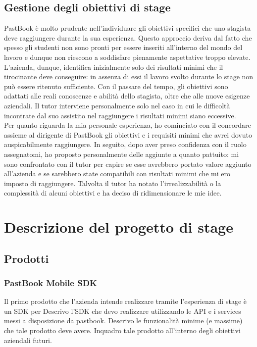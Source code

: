 		\subsection{Gestione degli obiettivi di stage}
			PastBook è molto prudente nell'individuare gli obiettivi specifici che uno stagista deve raggiungere durante la sua
			esperienza. Questo approccio deriva dal fatto che spesso gli studenti non sono pronti per essere inseriti all'interno del
			mondo del lavoro e dunque non riescono a soddisfare pienamente aspettative troppo elevate.\\
			L'azienda, dunque, identifica inizialmente solo dei risultati minimi che il tirocinante deve conseguire: in assenza di essi
			il lavoro svolto durante lo stage non può essere ritenuto sufficiente. Con il passare del tempo, gli obiettivi sono adattati
			alle reali conoscenze e abilità dello stagista, oltre che alle nuove esigenze aziendali. Il tutor interviene personalmente
			solo nel caso in cui le difficoltà incontrate dal suo assistito nel raggiungere i risultati minimi siano eccessive.\\
			Per quanto riguarda la mia personale esperienza, ho cominciato con il concordare assieme al dirigente di PastBook gli
			obiettivi e i requisiti minimi che avrei dovuto auspicabilmente raggiungere. In seguito, dopo aver preso confidenza con il
			ruolo assegnatomi, ho proposto personalmente delle aggiunte a quanto pattuito: mi sono confrontato con il tutor per capire
			se esse avrebbero portato valore aggiunto all'azienda e se sarebbero state compatibili con risultati minimi che mi ero
			imposto di raggiungere. Talvolta il tutor ha notato l'irrealizzabilità o la complessità di alcuni obiettivi e ha deciso di
			ridimensionare le mie idee.
	\section{Descrizione del progetto di stage}
		\subsection{Prodotti}
			\subsubsection{PastBook Mobile SDK}
				Il primo prodotto che l'azienda intende realizzare tramite l'esperienza di stage è un SDK per
				Descrivo l'SDK che devo realizzare utilizzando le API e i services messi a disposizione da pastbook. Descrivo le
				funzionalità minime (e massime) che tale prodotto deve avere. Inquadro tale prodotto all'interno degli obiettivi
				aziendali futuri.
